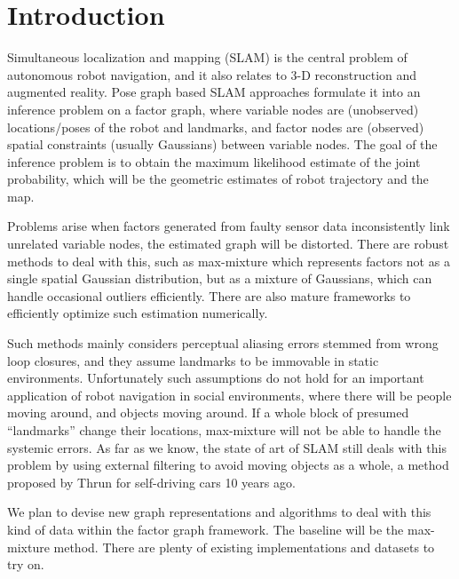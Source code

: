 \section{Introduction}
Simultaneous localization and mapping (SLAM) is the central problem of autonomous robot navigation, and it also relates to 3-D reconstruction and augmented reality. Pose graph based SLAM approaches formulate it into an inference problem on a factor graph, where variable nodes are (unobserved) locations/poses of the robot and landmarks, and factor nodes are (observed) spatial constraints (usually Gaussians) between variable nodes. The goal of the inference problem is to obtain the maximum likelihood estimate of the joint probability, which will be the geometric estimates of robot trajectory and the map.


Problems arise when factors generated from faulty sensor data inconsistently link unrelated variable nodes, the estimated graph will be distorted. There are robust methods to deal with this, such as max-mixture\cite{mm} which represents factors not as a single spatial Gaussian distribution, but as a mixture of Gaussians, which can handle occasional outliers efficiently. There are also mature frameworks to efficiently optimize such estimation numerically\cite{isam}.

Such methods mainly considers perceptual aliasing errors stemmed from wrong loop closures, and they assume landmarks to be immovable in static environments. Unfortunately such assumptions do not hold for an important application of robot navigation in social environments, where there will be people moving around, and objects moving around. If a whole block of presumed ``landmarks'' change their locations, max-mixture will not be able to handle the systemic errors. As far as we know, the state of art of SLAM still deals with this problem by using external filtering to avoid moving objects as a whole, a method proposed by Thrun for self-driving cars 10 years ago.

We plan to devise new graph representations and algorithms to deal with this kind of data within the factor graph framework. The baseline will be the max-mixture method. There are plenty of existing implementations and datasets to try on.
